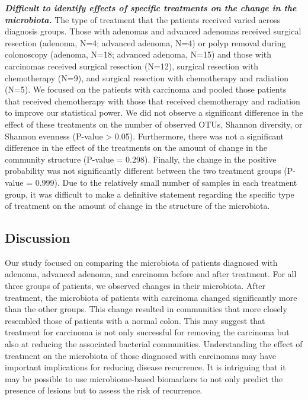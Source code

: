 \documentclass[12pt,]{article}
\begin{document}
\textbf{\emph{Difficult to identify effects of specific treatments on
the change in the microbiota.}} The type of treatment that the patients
received varied across diagnosis groups. Those with adenomas and
advanced adenomas received surgical resection (adenoma, N=4; advanced
adenoma, N=4) or polyp removal during colonoscopy (adenoma, N=18;
advanced adenoma, N=15) and those with carcinomas received surgical
resection (N=12), surgical resection with chemotherapy (N=9), and
surgical resection with chemotherapy and radiation (N=5). We focused on
the patients with carcinoma and pooled those patients that received
chemotherapy with those that received chemotherapy and radiation to
improve our statistical power. We did not observe a significant
difference in the effect of these treatments on the number of observed
OTUs, Shannon diversity, or Shannon evenness (P-value \textgreater{}
0.05). Furthermore, there was not a significant difference in the effect
of the treatments on the amount of change in the community structure
(P-value = 0.298). Finally, the change in the positive probability was
not significantly different between the two treatment groups (P-value =
0.999). Due to the relatively small number of samples in each treatment
group, it was difficult to make a definitive statement regarding the
specific type of treatment on the amount of change in the structure of
the microbiota.

\newpage

\subsection{Discussion}\label{discussion}

Our study focused on comparing the microbiota of patients diagnosed with
adenoma, advanced adenoma, and carcinoma before and after treatment. For
all three groups of patients, we observed changes in their microbiota.
After treatment, the microbiota of patients with carcinoma changed
significantly more than the other groups. This change resulted in
communities that more closely resembled those of patients with a normal
colon. This may suggest that treatment for carcinoma is not only
successful for removing the carcinoma but also at reducing the
associated bacterial communities. Understanding the effect of treatment
on the microbiota of those diagnosed with carcinomas may have important
implications for reducing disease recurrence. It is intriguing that it
may be possible to use microbiome-based biomarkers to not only predict
the presence of lesions but to assess the risk of recurrence.
\end{document}
